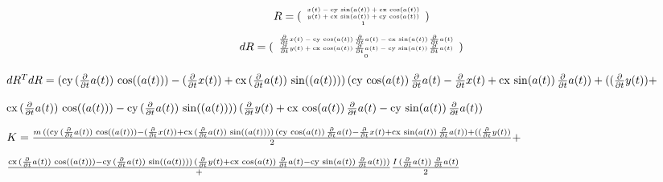 \documentclass[fleqn, a4paper, 12pt, russian]{article}
\begin{document}
	
	\begin{landscape}
		
		
		\begin{equation}
		\tiny{
			R=
			(\begin{array}{c} x(t)-\mathrm{cy}\,\sin(a(t))+\mathrm{cx}\,\cos(a(t))\\ y(t)+\mathrm{cx}\,\sin(a(t))+\mathrm{cy}\,\cos(a(t))\\ 1 \end{array})
		}\end{equation}
		\begin{equation}
		\tiny{
			dR=
			(\begin{array}{c} \frac{\partial }{\partial t} x(t)-\mathrm{cy}\,\cos(a(t))\,\frac{\partial }{\partial t} a(t)-\mathrm{cx}\,\sin(a(t))\,\frac{\partial }{\partial t} a(t)\\ \frac{\partial }{\partial t} y(t)+\mathrm{cx}\,\cos(a(t))\,\frac{\partial }{\partial t} a(t)-\mathrm{cy}\,\sin(a(t))\,\frac{\partial }{\partial t} a(t)\\ 0 \end{array})
		}\end{equation}
		
	$\tiny{
			dR^TdR=
			(\mathrm{cy}\,(\frac{\partial }{\partial t} a(t))\,\cos((a(t)))-(\frac{\partial }{\partial t} x(t))+\mathrm{cx}\,(\frac{\partial }{\partial t} a(t))\,\sin((a(t))))\,(\mathrm{cy}\,\cos(a(t))\,\frac{\partial }{\partial t} a(t)-\frac{\partial }{\partial t} x(t)+\mathrm{cx}\,\sin(a(t))\,\frac{\partial }{\partial t} a(t))+((\frac{\partial }{\partial t} y(t))+}$
			
			
			$\tiny{\mathrm{cx}\,(\frac{\partial }{\partial t} a(t))\,\cos((a(t)))-\mathrm{cy}\,(\frac{\partial }{\partial t} a(t))\,\sin((a(t))))\,(\frac{\partial }{\partial t} y(t)+\mathrm{cx}\,\cos(a(t))\,\frac{\partial }{\partial t} a(t)-\mathrm{cy}\,\sin(a(t))\,\frac{\partial }{\partial t} a(t))
		}$
		
		
		$\tiny{
			K=
			\frac{m\,((\mathrm{cy}\,(\frac{\partial }{\partial t} a(t))\,\cos((a(t)))-(\frac{\partial }{\partial t} x(t))+\mathrm{cx}\,(\frac{\partial }{\partial t} a(t))\,\sin((a(t))))\,(\mathrm{cy}\,\cos(a(t))\,\frac{\partial }{\partial t} a(t)-\frac{\partial }{\partial t} x(t)+\mathrm{cx}\,\sin(a(t))\,\frac{\partial }{\partial t} a(t))+((\frac{\partial }{\partial t} y(t))}{2}+}$	
		
		
		$\tiny{\frac{\mathrm{cx}\,(\frac{\partial }{\partial t} a(t))\,\cos((a(t)))-\mathrm{cy}\,(\frac{\partial }{\partial t} a(t))\,\sin((a(t))))\,(\frac{\partial }{\partial t} y(t)+\mathrm{cx}\,\cos(a(t))\,\frac{\partial }{\partial t} a(t)-\mathrm{cy}\,\sin(a(t))\,\frac{\partial }{\partial t} a(t)))}+\frac{I\,(\frac{\partial }{\partial t} a(t))\,\frac{\partial }{\partial t} a(t)}{2}
		}$
	

\end{landscape}
\end{document}
